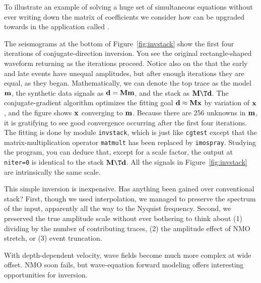 To illustrate an example of solving a huge set of simultaneous
equations without ever writing down the matrix of coefficients
we consider how
{\it {}} can be upgraded towards
{\it {}} in the application called .
\par
The seismograms at the bottom of Figure~\ref{fig:invstack}
show the first four iterations of conjugate-direction inversion.
You see the original rectangle-shaped waveform returning
as the iterations proceed.
Notice also on the 
that the early and late events have unequal amplitudes,
but after enough iterations they are equal,
as they began.
Mathematically,
we can denote the top trace as the model $\bold m$,
the synthetic data signals as $\bold d = \bold M \bold m$,
and the stack as $\bold M\T \bold d$.
The conjugate-gradient algorithm optimizes the fitting goal
$\bold d \approx \bold M \bold x$ by variation of $\bold x$,
and the figure shows $\bold x$ converging to $\bold m$.
Because there are 256 unknowns in $\bold m$,
it is gratifying to see good convergence occurring
after the first four iterations.
The fitting is done by module {\tt invstack},
which is just like
\texttt{cgtest}  except that the matrix-multiplication operator
\texttt{matmult}  has been replaced by
\texttt{imospray}. %
Studying the program,
you can deduce that,
except for a scale factor,
the output at {\tt niter=0} is identical to the stack $\bold M\T \bold d$.
All the signals in Figure~\ref{fig:invstack} are intrinsically the same scale.%
\par
This simple inversion is inexpensive.
Has anything been gained over conventional stack?
First,
though we used  interpolation,
we managed to preserve the spectrum of the input,
apparently all the way to the Nyquist frequency.
Second, we preserved the true amplitude scale
without ever bothering to think about
(1) dividing by the number of contributing traces,
(2) the amplitude effect of NMO stretch, or
(3) event truncation.
\par
With depth-dependent velocity,
wave fields become much more complex at wide offset.
NMO soon fails,
but wave-equation forward modeling
offers interesting opportunities for inversion.

